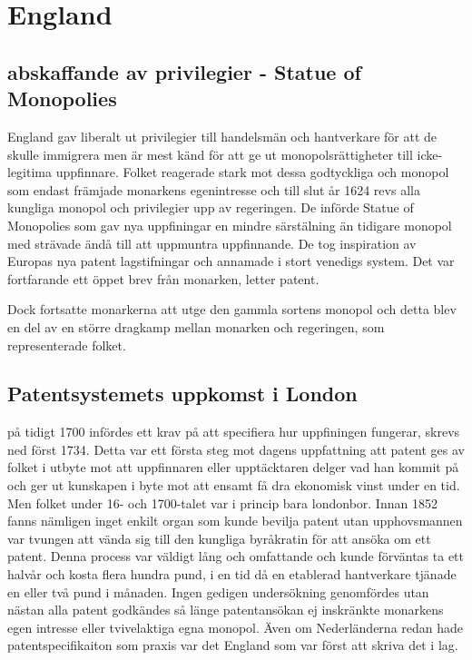 \section{England} %
\label{sec:england}

\subsection{abskaffande av privilegier - Statue of Monopolies} %
\label{sub:abskaffande_av_privilegier_statue_of_monopolies}

England gav liberalt ut privilegier till handelsmän och hantverkare för att de skulle immigrera men är mest känd för att ge ut monopolsrättigheter till icke-legitima uppfinnare. Folket reagerade stark mot dessa godtyckliga och monopol som endast främjade monarkens egenintresse och till slut år 1624 revs alla kungliga monopol och privilegier upp av regeringen. De införde Statue of Monopolies som gav nya uppfiningar en mindre särstälning än tidigare monopol med strävade ändå till att uppmuntra uppfinnande. De tog inspiration av Europas nya patent lagstifningar och annamade i stort venedigs system. Det var fortfarande ett öppet brev från monarken, letter patent.

Dock fortsatte monarkerna att utge den gammla sortens monopol och detta blev en del av en större dragkamp mellan monarken och regeringen, som representerade folket. 


\subsection{Patentsystemets uppkomst i London} %
\label{sub:patentsystemets_uppkomst_i_london}


på tidigt 1700 infördes ett krav på att specifiera hur uppfiningen fungerar, skrevs ned först 1734. Detta var ett första steg mot dagens uppfattning att patent ges av folket i utbyte mot att uppfinnaren eller upptäcktaren delger vad han kommit på och ger ut kunskapen i byte mot att ensamt få dra ekonomisk vinst under en tid. Men folket under 16- och 1700-talet var i princip bara londonbor. Innan 1852 fanns nämligen inget enkilt organ som kunde bevilja patent utan upphovsmannen var tvungen att vända sig till den kungliga byråkratin för att ansöka om ett patent. Denna process var väldigt lång och omfattande och kunde förväntas ta ett halvår och kosta flera hundra pund, i en tid då en etablerad hantverkare tjänade en eller två pund i månaden. Ingen gedigen undersökning genomfördes utan nästan alla patent godkändes så länge patentansökan ej inskränkte monarkens egen intresse eller tvivelaktiga egna monopol. Även om Nederländerna redan hade patentspecifikaiton som praxis var det England som var först att skriva det i lag. 

